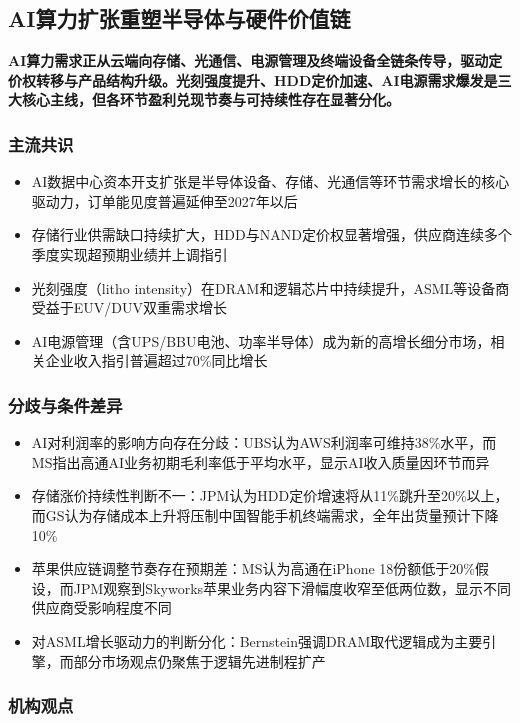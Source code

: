 \documentclass[11pt]{ctexart}
\begin{document}
\subsection{AI算力扩张重塑半导体与硬件价值链}
\textbf{AI算力需求正从云端向存储、光通信、电源管理及终端设备全链条传导，驱动定价权转移与产品结构升级。光刻强度提升、HDD定价加速、AI电源需求爆发是三大核心主线，但各环节盈利兑现节奏与可持续性存在显著分化。}
\subsubsection*{主流共识}
\begin{itemize}
  \item AI数据中心资本开支扩张是半导体设备、存储、光通信等环节需求增长的核心驱动力，订单能见度普遍延伸至2027年以后
  \item 存储行业供需缺口持续扩大，HDD与NAND定价权显著增强，供应商连续多个季度实现超预期业绩并上调指引
  \item 光刻强度（litho intensity）在DRAM和逻辑芯片中持续提升，ASML等设备商受益于EUV/DUV双重需求增长
  \item AI电源管理（含UPS/BBU电池、功率半导体）成为新的高增长细分市场，相关企业收入指引普遍超过70\%同比增长
\end{itemize}
\subsubsection*{分歧与条件差异}
\begin{itemize}
  \item AI对利润率的影响方向存在分歧：UBS认为AWS利润率可维持38\%水平，而MS指出高通AI业务初期毛利率低于平均水平，显示AI收入质量因环节而异
  \item 存储涨价持续性判断不一：JPM认为HDD定价增速将从11\%跳升至20\%以上，而GS认为存储成本上升将压制中国智能手机终端需求，全年出货量预计下降10\%
  \item 苹果供应链调整节奏存在预期差：MS认为高通在iPhone 18份额低于20\%假设，而JPM观察到Skyworks苹果业务内容下滑幅度收窄至低两位数，显示不同供应商受影响程度不同
  \item 对ASML增长驱动力的判断分化：Bernstein强调DRAM取代逻辑成为主要引擎，而部分市场观点仍聚焦于逻辑先进制程扩产
\end{itemize}
\subsubsection*{机构观点}
\end{document}
